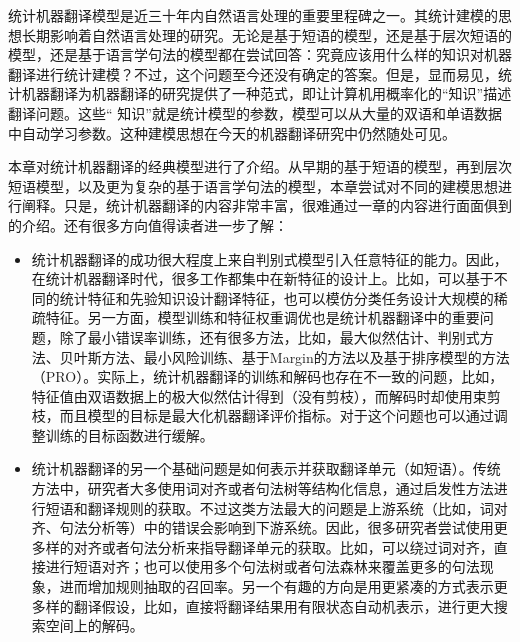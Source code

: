 \parinterval 统计机器翻译模型是近三十年内自然语言处理的重要里程碑之一。其统计建模的思想长期影响着自然语言处理的研究。无论是基于短语的模型，还是基于层次短语的模型，还是基于语言学句法的模型都在尝试回答：究竟应该用什么样的知识对机器翻译进行统计建模？不过，这个问题至今还没有确定的答案。但是，显而易见，统计机器翻译为机器翻译的研究提供了一种范式，即让计算机用概率化的``知识''描述翻译问题。这些`` 知识''就是统计模型的参数，模型可以从大量的双语和单语数据中自动学习参数。这种建模思想在今天的机器翻译研究中仍然随处可见。

\parinterval 本章对统计机器翻译的经典模型进行了介绍。从早期的基于短语的模型，再到层次短语模型，以及更为复杂的基于语言学句法的模型，本章尝试对不同的建模思想进行阐释。只是，统计机器翻译的内容非常丰富，很难通过一章的内容进行面面俱到的介绍。还有很多方向值得读者进一步了解：

\begin{itemize}
\vspace{0.5em}
\item 统计机器翻译的成功很大程度上来自判别式模型引入任意特征的能力。因此，在统计机器翻译时代，很多工作都集中在新特征的设计上。比如，可以基于不同的统计特征和先验知识设计翻译特征\cite{och2004smorgasbord,Chiang200911,gildea2003loosely}，也可以模仿分类任务设计大规模的稀疏特征\cite{chiang2008online}。另一方面，模型训练和特征权重调优也是统计机器翻译中的重要问题，除了最小错误率训练，还有很多方法，比如，最大似然估计\cite{koehn2003statistical,Peter1993The}、判别式方法\cite{Blunsom2008A}、贝叶斯方法\cite{Blunsom2009A,Cohn2009A}、最小风险训练\cite{smith2006minimum,li2009first-}、基于Margin的方法\cite{watanabe2007online,Chiang200911}以及基于排序模型的方法（PRO）\cite{Hopkins2011Tuning,dreyer2015apro}。实际上，统计机器翻译的训练和解码也存在不一致的问题，比如，特征值由双语数据上的极大似然估计得到（没有剪枝），而解码时却使用束剪枝，而且模型的目标是最大化机器翻译评价指标。对于这个问题也可以通过调整训练的目标函数进行缓解\cite{XiaoA,marcu2006practical}。
\vspace{0.5em}
\item 统计机器翻译的另一个基础问题是如何表示并获取翻译单元（如短语）。传统方法中，研究者大多使用词对齐或者句法树等结构化信息，通过启发性方法进行短语和翻译规则的获取。不过这类方法最大的问题是上游系统（比如，词对齐、句法分析等）中的错误会影响到下游系统。因此，很多研究者尝试使用更多样的对齐或者句法分析来指导翻译单元的获取。比如，可以绕过词对齐，直接进行短语对齐\cite{denero2010phrase}；也可以使用多个句法树或者句法森林来覆盖更多的句法现象，进而增加规则抽取的召回率\cite{mi2008forest,xiao2010empirical}。另一个有趣的方向是用更紧凑的方式表示更多样的翻译假设，比如，直接将翻译结果用有限状态自动机表示，进行更大搜索空间上的解码\cite{de2010hierarchical,Casacuberta2004Machine}。

\end{itemize}
